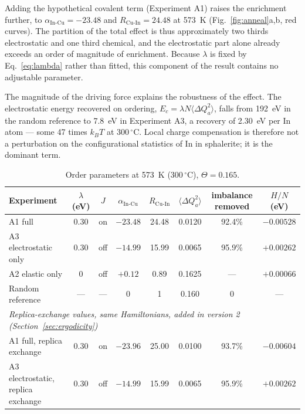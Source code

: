 \documentclass[11pt,a4paper]{article}
\newcommand{\dQ}{\Delta Q}
\newcommand{\aInCu}{\alpha_{\mathrm{In\text{-}Cu}}}
\newcommand{\RCuIn}{R_{\mathrm{Cu\text{-}In}}}
\begin{document}
Adding the hypothetical covalent term (Experiment A1) raises the enrichment
further, to $\aInCu = -23.48$ and $\RCuIn = 24.48$ at 573~K
(Fig.~\ref{fig:anneal}a,b, red curves). The partition of the total effect is
thus approximately two thirds electrostatic and one third chemical, and the
electrostatic part alone already exceeds an order of magnitude of enrichment.
Because $\lambda$ is fixed by Eq.~\eqref{eq:lambda} rather than fitted, this
component of the result contains no adjustable parameter.

The magnitude of the driving force explains the robustness of the effect. The
electrostatic energy recovered on ordering,
$E_c = \lambda N \langle \dQ_a^2\rangle$, falls from 192~eV in the random
reference to 7.8~eV in Experiment A3, a recovery of 2.30~eV per In atom --- some
47 times $k_BT$ at $300\,^\circ$C. Local charge compensation is therefore not a
perturbation on the configurational statistics of In in sphalerite; it is the
dominant term.

\begin{table}[htbp]
\centering
\caption{Order parameters at 573~K ($300\,^\circ$C), $\Theta = 0.165$.}
\label{tab:573}
\small
\begin{tabular}{lccccccc}
\toprule
Experiment & $\lambda$ (eV) & $J$ & $\aInCu$ & $\RCuIn$ & $\langle \dQ_a^2\rangle$ & imbalance removed & $H/N$ (eV) \\
\midrule
A1 full & 0.30 & on & $-23.48$ & 24.48 & 0.0120 & 92.4\% & $-0.00528$ \\
A3 electrostatic only & 0.30 & off & $-14.99$ & 15.99 & 0.0065 & 95.9\% & $+0.00262$ \\
A2 elastic only & 0 & off & $+0.12$ & 0.89 & 0.1625 & --- & $+0.00066$ \\
Random reference & --- & --- & 0 & 1 & 0.160 & 0 & --- \\
\midrule
\multicolumn{8}{l}{\footnotesize \textit{Replica-exchange values, same Hamiltonians, added in version 2 (Section~\ref{sec:ergodicity})}} \\
A1 full, replica exchange & 0.30 & on & $-23.96$ & 25.00 & 0.0100 & 93.7\% & $-0.00604$ \\
A3 electrostatic, replica exchange & 0.30 & off & $-14.99$ & 15.99 & 0.0065 & 95.9\% & $+0.00262$ \\
\bottomrule
\end{tabular}
\end{table}
\end{document}
